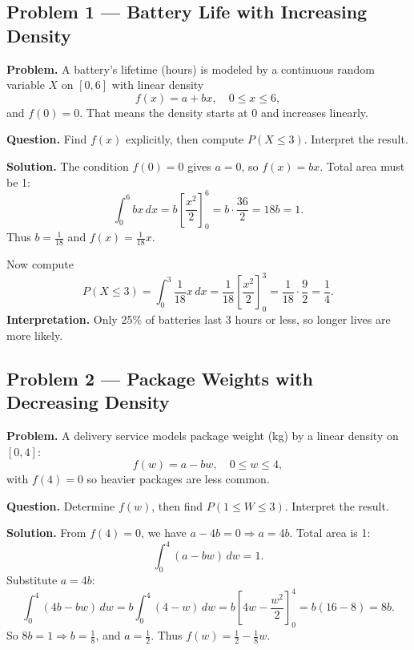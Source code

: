 	\begin{ExamProblems}
		
		\hypertarget{c3-ex1}{}
		\item
		\subsection*{Problem 1 — Battery Life with Increasing Density}
		
		\textbf{Problem.}
		A battery's lifetime (hours) is modeled by a continuous random variable \(X\) on \([0, 6]\) with
		linear density
		\[
		f(x)=a+bx,\quad 0\le x\le 6,
		\]
		and \(f(0)=0\). That means the density starts at 0 and increases linearly.
		
		\textbf{Question.} Find \(f(x)\) explicitly, then compute \(P(X\le 3)\). Interpret the result.
		
		\textbf{Solution.}
		The condition \(f(0)=0\) gives \(a=0\), so \(f(x)=bx\).
		Total area must be 1:
		\[
		\int_0^6 bx\,dx=b\left[\frac{x^2}{2}\right]_0^6=b\cdot\frac{36}{2}=18b=1.
		\]
		Thus \(b=\frac{1}{18}\) and \(f(x)=\frac{1}{18}x\).
		
		Now compute
		\[
		P(X\le 3)=\int_0^3 \frac{1}{18}x\,dx=\frac{1}{18}\left[\frac{x^2}{2}\right]_0^3=\frac{1}{18}\cdot\frac{9}{2}=\frac{1}{4}.
		\]
		\textbf{Interpretation.} Only 25\% of batteries last 3 hours or less, so longer lives are more likely.
		
		
		\hypertarget{c3-ex2}{}
		\item
		\subsection*{Problem 2 — Package Weights with Decreasing Density}
		
		\textbf{Problem.}
		A delivery service models package weight (kg) by a linear density on \([0, 4]\):
		\[
		f(w)=a-bw,\quad 0\le w\le 4,
		\]
		with \(f(4)=0\) so heavier packages are less common.
		
		\textbf{Question.} Determine \(f(w)\), then find \(P(1\le W\le 3)\). Interpret the result.
		
		\textbf{Solution.}
		From \(f(4)=0\), we have \(a-4b=0\Rightarrow a=4b\).
		Total area is 1:
		\[
		\int_0^4 (a-bw)\,dw=1.
		\]
		Substitute \(a=4b\):
		\[
		\int_0^4 (4b-bw)\,dw=b\int_0^4 (4-w)\,dw
		=b\left[4w-\frac{w^2}{2}\right]_0^4
		=b(16-8)=8b.
		\]
		So \(8b=1\Rightarrow b=\frac{1}{8}\), and \(a=\frac{1}{2}\).
		Thus \(f(w)=\frac{1}{2}-\frac{1}{8}w\).
		

\end{ExamProblems}
